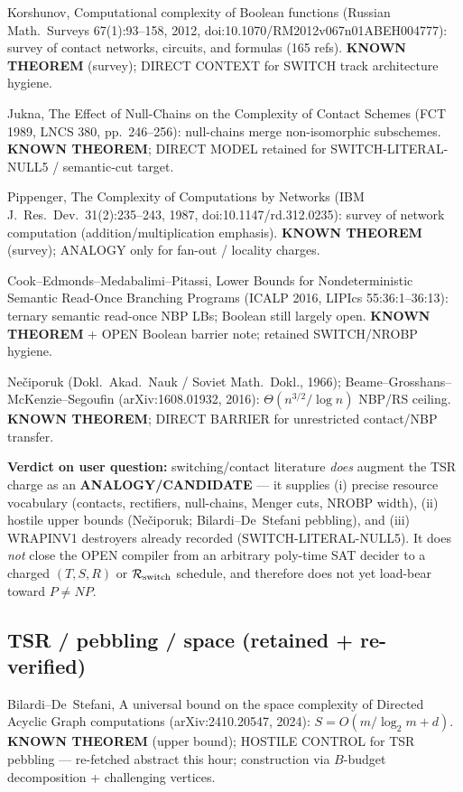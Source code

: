 \documentclass[11pt]{article}
\begin{document}
Korshunov, Computational complexity of Boolean functions
(Russian Math.\ Surveys 67(1):93--158, 2012, doi:10.1070/RM2012v067n01ABEH004777):
survey of contact networks, circuits, and formulas (165 refs).
\textbf{KNOWN THEOREM} (survey); DIRECT CONTEXT for SWITCH track architecture hygiene.

Jukna, The Effect of Null-Chains on the Complexity of Contact Schemes
(FCT 1989, LNCS 380, pp.\ 246--256): null-chains merge non-isomorphic subschemes.
\textbf{KNOWN THEOREM}; DIRECT MODEL retained for SWITCH-LITERAL-NULL5 / semantic-cut target.

Pippenger, The Complexity of Computations by Networks
(IBM J.\ Res.\ Dev.\ 31(2):235--243, 1987, doi:10.1147/rd.312.0235):
survey of network computation (addition/multiplication emphasis).
\textbf{KNOWN THEOREM} (survey); ANALOGY only for fan-out / locality charges.

Cook--Edmonds--Medabalimi--Pitassi, Lower Bounds for Nondeterministic Semantic
Read-Once Branching Programs (ICALP 2016, LIPIcs 55:36:1--36:13):
ternary semantic read-once NBP LBs; Boolean still largely open.
\textbf{KNOWN THEOREM} + OPEN Boolean barrier note; retained SWITCH/NROBP hygiene.

Ne\v{c}iporuk (Dokl.\ Akad.\ Nauk / Soviet Math.\ Dokl., 1966);
Beame--Grosshans--McKenzie--Segoufin (arXiv:1608.01932, 2016):
$\Theta(n^{3/2}/\log n)$ NBP/RS ceiling. \textbf{KNOWN THEOREM}; DIRECT BARRIER
for unrestricted contact/NBP transfer.

\textbf{Verdict on user question:} switching/contact literature \emph{does} augment the
TSR charge as an \textbf{ANALOGY/CANDIDATE} --- it supplies (i) precise resource vocabulary
(contacts, rectifiers, null-chains, Menger cuts, NROBP width), (ii) hostile upper bounds
(Ne\v{c}iporuk; Bilardi--De~Stefani pebbling), and (iii) WRAPINV1 destroyers already
recorded (SWITCH-LITERAL-NULL5). It does \emph{not} close the OPEN compiler from an
arbitrary poly-time SAT decider to a charged $(T,S,R)$ or $\mathcal R_{\rm switch}$ schedule,
and therefore does not yet load-bear toward $P\neq NP$.

\subsection*{TSR / pebbling / space (retained + re-verified)}
Bilardi--De~Stefani, A universal bound on the space complexity of Directed Acyclic Graph
computations (arXiv:2410.20547, 2024): $S=O(m/\log_2 m+d)$.
\textbf{KNOWN THEOREM} (upper bound); HOSTILE CONTROL for TSR pebbling --- re-fetched
abstract this hour; construction via $B$-budget decomposition + challenging vertices.
\end{document}
